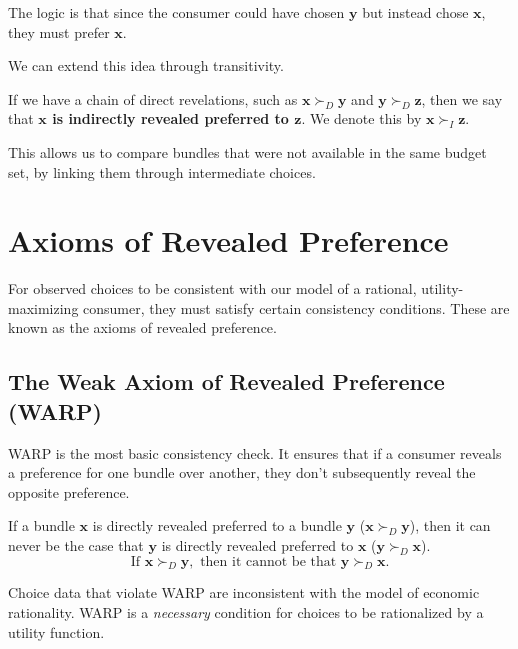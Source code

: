 The logic is that since the consumer could have chosen \(\mathbf{y}\) but instead chose \(\mathbf{x}\), they must prefer \(\mathbf{x}\).

We can extend this idea through transitivity.

\begin{definition}
    If we have a chain of direct revelations, such as \(\mathbf{x} \succ_D \mathbf{y}\) and \(\mathbf{y} \succ_D \mathbf{z}\), then we say that \textbf{\(\mathbf{x}\) is indirectly revealed preferred to \(\mathbf{z}\)}. We denote this by \(\mathbf{x} \succ_I \mathbf{z}\).
\end{definition}

This allows us to compare bundles that were not available in the same budget set, by linking them through intermediate choices.

\section{Axioms of Revealed Preference}
For observed choices to be consistent with our model of a rational, utility-maximizing consumer, they must satisfy certain consistency conditions. These are known as the axioms of revealed preference.

\subsection{The Weak Axiom of Revealed Preference (WARP)}
WARP is the most basic consistency check. It ensures that if a consumer reveals a preference for one bundle over another, they don't subsequently reveal the opposite preference.

\begin{definition}
    If a bundle \(\mathbf{x}\) is directly revealed preferred to a bundle \(\mathbf{y}\) (\(\mathbf{x} \succ_D \mathbf{y}\)), then it can never be the case that \(\mathbf{y}\) is directly revealed preferred to \(\mathbf{x}\) (\(\mathbf{y} \succ_D \mathbf{x}\)).
    \[
    \text{If } \mathbf{x} \succ_D \mathbf{y}, \text{ then it cannot be that } \mathbf{y} \succ_D \mathbf{x}.
    \]
\end{definition}

Choice data that violate WARP are inconsistent with the model of economic rationality. WARP is a \textit{necessary} condition for choices to be rationalized by a utility function.

